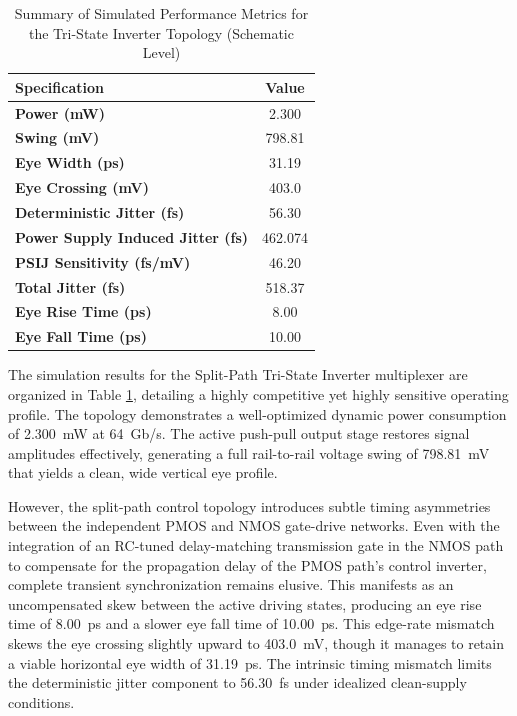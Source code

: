 \begin{table}[H]
    \centering
    \caption{Summary of Simulated Performance Metrics for the Tri-State Inverter Topology (Schematic Level)}
    \label{tab:tinv_metrics}
    \renewcommand{\arraystretch}{1.4}
    \setlength{\tabcolsep}{12pt}
    \begin{tabular}{|l|c|}
        \hline
        \textbf{Specification} & \textbf{Value} \\ \hline
        \textbf{Power (mW)} & 2.300 \\ \hline
        \textbf{Swing (mV)} & 798.81 \\ \hline
        \textbf{Eye Width (ps)} & 31.19 \\ \hline
        \textbf{Eye Crossing (mV)} & 403.0 \\ \hline
        \textbf{Deterministic Jitter (fs)} & 56.30 \\ \hline
        \textbf{Power Supply Induced Jitter (fs)} & 462.074 \\ \hline
        \textbf{PSIJ Sensitivity (fs/mV)} & 46.20 \\ \hline
        \textbf{Total Jitter (fs)} & 518.37 \\ \hline
        \textbf{Eye Rise Time (ps)} & 8.00 \\ \hline
        \textbf{Eye Fall Time (ps)} & 10.00 \\ \hline
    \end{tabular}
\end{table}

The simulation results for the Split-Path Tri-State Inverter multiplexer are organized in Table \ref{tab:tinv_metrics}, detailing a highly competitive yet highly sensitive operating profile. The topology demonstrates a well-optimized dynamic power consumption of 2.300~mW at 64~Gb/s. The active push-pull output stage restores signal amplitudes effectively, generating a full rail-to-rail voltage swing of 798.81~mV that yields a clean, wide vertical eye profile.

However, the split-path control topology introduces subtle timing asymmetries between the independent PMOS and NMOS gate-drive networks. Even with the integration of an RC-tuned delay-matching transmission gate in the NMOS path to compensate for the propagation delay of the PMOS path's control inverter, complete transient synchronization remains elusive. This manifests as an uncompensated skew between the active driving states, producing an eye rise time of 8.00~ps and a slower eye fall time of 10.00~ps. This edge-rate mismatch skews the eye crossing slightly upward to 403.0~mV, though it manages to retain a viable horizontal eye width of 31.19~ps. The intrinsic timing mismatch limits the deterministic jitter component to 56.30~fs under idealized clean-supply conditions.

